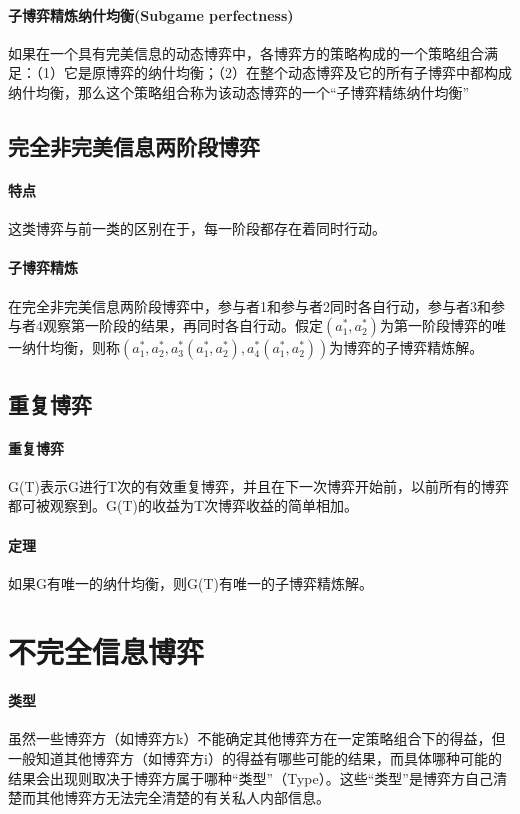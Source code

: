 \documentclass[12pt,a4paper]{article}
\begin{document}
\paragraph{子博弈精炼纳什均衡(Subgame perfectness)} 如果在一个具有完美信息的动态博弈中，各博弈方的策略构成的一个策略组合满足：（1）它是原博弈的纳什均衡；（2）在整个动态博弈及它的所有子博弈中都构成纳什均衡，那么这个策略组合称为该动态博弈的一个“子博弈精练纳什均衡”

\subsection{完全非完美信息两阶段博弈}
\paragraph{特点} 这类博弈与前一类的区别在于，每一阶段都存在着同时行动。
\paragraph{子博弈精炼} 在完全非完美信息两阶段博弈中，参与者1和参与者2同时各自行动，参与者3和参与者4观察第一阶段的结果，再同时各自行动。假定$(a_1^*,a_2^*)$为第一阶段博弈的唯一纳什均衡，则称$(a_1^*,a_2^*,a_3^*(a_1^*,a_2^*),a_4^*(a_1^*,a_2^*))$为博弈的子博弈精炼解。

\subsection{重复博弈}
\paragraph{重复博弈} G(T)表示G进行T次的有效重复博弈，并且在下一次博弈开始前，以前所有的博弈都可被观察到。G(T)的收益为T次博弈收益的简单相加。
\paragraph{定理} 如果G有唯一的纳什均衡，则G(T)有唯一的子博弈精炼解。





\section{不完全信息博弈}
\paragraph{类型} 虽然一些博弈方（如博弈方k）不能确定其他博弈方在一定策略组合下的得益，但一般知道其他博弈方（如博弈方i）的得益有哪些可能的结果，而具体哪种可能的结果会出现则取决于博弈方属于哪种“类型”（Type）。这些“类型”是博弈方自己清楚而其他博弈方无法完全清楚的有关私人内部信息。
\end{document}
